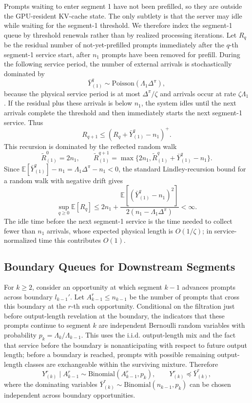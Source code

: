 Prompts waiting to enter segment 1 have not been prefilled, so they are outside the GPU-resident KV-cache state. The only subtlety is that the server may idle while waiting for the segment-1 threshold. We therefore index the segment-1 queue by threshold renewals rather than by realized processing iterations. Let \(R_q\) be the residual number of not-yet-prefilled prompts immediately after the \(q\)-th segment-1 service start, after \(n_1\) prompts have been removed for prefill. During the following service period, the number of external arrivals is stochastically dominated by
\[
    \bar Y^q_{(1)}\sim \mathrm{Poisson}(\Lambda_1\Delta^\pi),
\]
because the physical service period is at most \(\Delta^\pi/\zeta\) and arrivals occur at rate \(\zeta\Lambda_1\). If the residual plus these arrivals is below \(n_1\), the system idles until the next arrivals complete the threshold and then immediately starts the next segment-1 service. Thus
\[
    R_{q+1}\le (R_q+\bar Y^q_{(1)}-n_1)^+ .
\]
This recursion is dominated by the reflected random walk
\[
    \widetilde R^0_{(1)}=2n_1,\qquad
    \widetilde R^{q+1}_{(1)}
    =
    \max\{2n_1,\widetilde R^q_{(1)}+\bar Y^q_{(1)}-n_1\}.
\]
Since \(\mathbb{E}[\bar Y^q_{(1)}]-n_1=\Lambda_1\Delta^\pi-n_1<0\), the standard Lindley-recursion bound for a random walk with negative drift \citep[see, e.g.,][]{kingman1962queues,asmussen2003applied} gives
\[
    \sup_{q\ge0}\mathbb{E}[R_q]
    \le
    2n_1+
    \frac{\mathbb{E}[(\bar Y^q_{(1)}-n_1)^2]}{2(n_1-\Lambda_1\Delta^\pi)}
    <\infty .
\]
The idle time before the next segment-1 service is the time needed to collect fewer than \(n_1\) arrivals, whose expected physical length is \(O(1/\zeta)\); in service-normalized time this contributes \(O(1)\).

\subsection{Boundary Queues for Downstream Segments}

For \(k\ge2\), consider an opportunity at which segment \(k-1\) advances prompts across boundary \(l_{k-1}'\). Let \(A^r_{k-1}\le n_{k-1}\) be the number of prompts that cross this boundary at the \(r\)-th such opportunity. Conditional on the filtration just before output-length revelation at the boundary, the indicators that these prompts continue to segment \(k\) are independent Bernoulli random variables with probability \(p_k=\Lambda_k/\Lambda_{k-1}\). This uses the i.i.d. output-length mix and the fact that service before the boundary is nonanticipating with respect to future output length; before a boundary is reached, prompts with possible remaining output-length classes are exchangeable within the surviving mixture. Therefore
\[
    Y^r_{(k)}\mid A^r_{k-1}\sim \mathrm{Binomial}(A^r_{k-1},p_k),
    \qquad
    Y^r_{(k)}\preceq \bar Y^r_{(k)},
\]
where the dominating variables \(\bar Y^r_{(k)}\sim\mathrm{Binomial}(n_{k-1},p_k)\) can be chosen independent across boundary opportunities.

